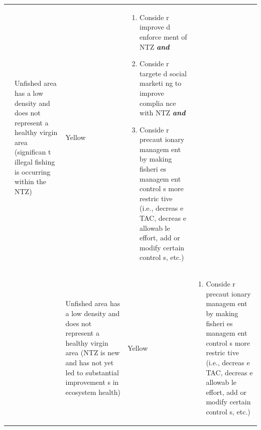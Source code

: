 \documentclass[]{book}
\providecommand{\tightlist}{%
  \setlength{\itemsep}{0pt}\setlength{\parskip}{0pt}}
\begin{document}
\begin{longtable}[]{@{}lllll@{}}
\begin{minipage}[t]{0.19\columnwidth}
\strut
\end{minipage} & \begin{minipage}[t]{0.19\columnwidth}\raggedright\strut
Unfished area has a low density and does not represent a healthy virgin
area (significan t illegal fishing is occurring within the NTZ)\strut
\end{minipage} & \begin{minipage}[t]{0.19\columnwidth}\raggedright\strut
Yellow\strut
\end{minipage} & \begin{minipage}[t]{0.19\columnwidth}\raggedright\strut
\begin{enumerate}
\def\labelenumi{\arabic{enumi}.}
\item
  Conside r improve d enforce ment of NTZ \textbf{\emph{and} }
\item
  Conside r targete d social marketi ng to improve complia nce with NTZ
  \textbf{\emph{and} }
\item
  Conside r precaut ionary managem ent by making fisheri es managem ent
  control s more restric tive (i.e., decreas e TAC, decreas e allowab le
  effort, add or modify certain control s, etc.)
\end{enumerate}\strut
\end{minipage}\tabularnewline
\begin{minipage}[t]{0.19\columnwidth}\raggedright\strut
\strut
\end{minipage} & \begin{minipage}[t]{0.19\columnwidth}\raggedright\strut
\strut
\end{minipage} & \begin{minipage}[t]{0.19\columnwidth}\raggedright\strut
Unfished area has a low density and does not represent a healthy virgin
area (NTZ is new and has not yet led to substantial improvement s in
ecosystem health)\strut
\end{minipage} & \begin{minipage}[t]{0.19\columnwidth}\raggedright\strut
Yellow\strut
\end{minipage} & \begin{minipage}[t]{0.19\columnwidth}\raggedright\strut
\begin{enumerate}
\def\labelenumi{\arabic{enumi}.}
\tightlist
\item
  Conside r precaut ionary managem ent by making fisheri es managem ent
  control s more restric tive (i.e., decreas e TAC, decreas e allowab le
  effort, add or modify certain control s, etc.)
\end{enumerate}\strut

\end{minipage}
\end{longtable}
\end{document}
